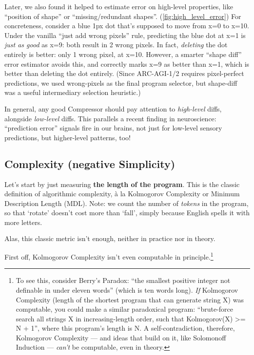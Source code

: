 \documentclass[11pt]{article}
\begin{document}
Later, we also found it helped to estimate error on high-level properties, like ``position of shape'' or ``missing/redundant shapes''. (\autoref{fig:high_level_error}) For concreteness, consider a blue 1px dot that's supposed to move from x=0 to x=10. Under the vanilla ``just add wrong pixels'' rule, predicting the blue dot at x=1 is \textit{just as good} as x=9: both result in 2 wrong pixels. In fact, \textit{deleting} the dot entirely is better: only 1 wrong pixel, at x=10. However, a smarter ``shape diff'' error estimator avoids this, and correctly marks x=9 as better than x=1, which is better than deleting the dot entirely. (Since ARC-AGI-1/2 requires pixel-perfect predictions, we used wrong-pixels as the final program selector, but shape-diff was a useful intermediary selection heuristic.)

In general, any good Compressor should pay attention to \textit{high-level} diffs, alongside \textit{low-level} diffs. This parallels a recent finding in neuroscience: ``prediction error'' signals fire in our brains, not just for low-level sensory predictions, but higher-level patterns, too! \citep{local_global_oddball,high_level_prediction_errors}

\subsection{Complexity (negative Simplicity)}

Let's start by just measuring \textbf{the length of the program}. This is the classic definition of algorithmic complexity, à la Kolmogorov Complexity or Minimum Description Length (MDL). Note: we count the number of \textit{tokens} in the program, so that `rotate' doesn't cost more than `fall', simply because English spells it with more letters.

Alas, this classic metric isn't enough, neither in practice nor in theory.

First off, Kolmogorov Complexity isn't even computable in principle.\footnote{To see this, consider Berry's Paradox: ``the smallest positive integer not definable in under eleven words'' (which is ten words long). \textit{If} Kolmogorov Complexity (length of the shortest program that can generate string X) was computable, you could make a similar paradoxical program: ``brute-force search all strings X in increasing-length order, such that Kolmogorov(X) >= N + 1'', where this program's length is N. A self-contradiction, therefore, Kolmogorov Complexity — and ideas that build on it, like Solomonoff Induction — \textit{can't} be computable, even in theory.}
\end{document}
